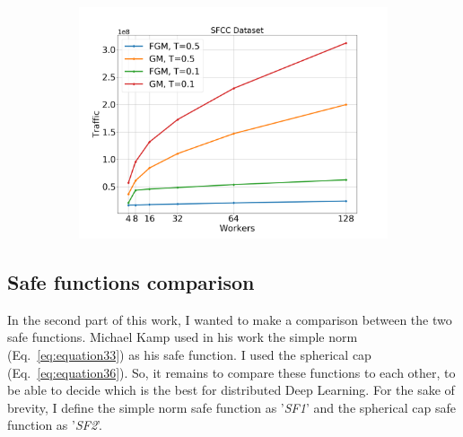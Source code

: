 \begin{figure}[H]
\begin{subfigure}[b]{0.48\textwidth}
        \caption{}
    \end{subfigure}
    \begin{subfigure}[b]{0.50\textwidth}
        \includegraphics[width=\textwidth]{./images/results/sfc-plots/exp_Fig_3_3_b.png}
        \caption{}
    \end{subfigure}
    \caption{}
    \label{fig:sfcc_3_b}
\end{figure}

\newpage

\subsection{Safe functions comparison}\label{subsec:safe-functions-comparison}

In the second part of this work, I wanted to make a comparison between the two safe functions.
Michael Kamp used in his work the simple norm (Eq.~\ref{eq:equation33}) as his safe function.
I used the spherical cap (Eq.~\ref{eq:equation36}).
So, it remains to compare these functions to each other, to be able to decide which is the best for distributed Deep Learning.
For the sake of brevity, I define the simple norm safe function as '\emph{SF1}' and the spherical cap safe function as '\emph{SF2}'.

